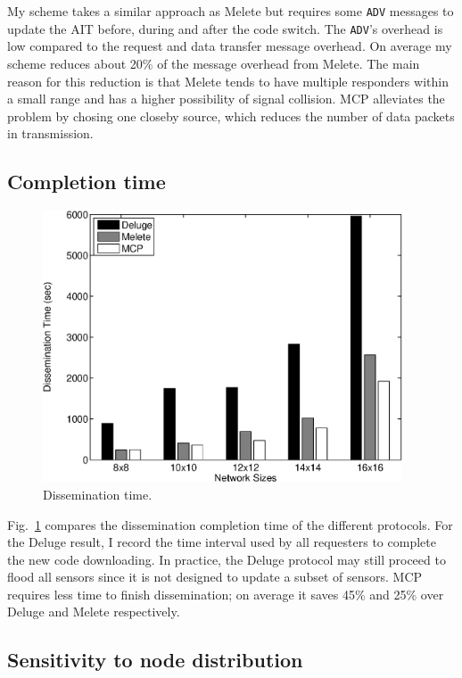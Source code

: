 My scheme takes a similar approach as Melete but requires some {\tt ADV} messages to update the AIT before, during and after the code switch. The {\tt ADV}'s overhead is low compared to the request and data transfer message overhead. On average my scheme reduces about 20\% of the message overhead from Melete. The main reason for this reduction is that Melete tends to have multiple responders within a small range and has a higher possibility of signal collision. MCP alleviates the problem by chosing one closeby source, which reduces the number of data packets in transmission.

\subsection{Completion time}

\begin{figure}[htbp]
\centering
\includegraphics[width=4.2in]{figures/ftime.eps}
\caption{Dissemination time.}
\label{ftime}
\end{figure}

Fig.~\ref{ftime} compares the dissemination completion time of the different protocols. For the Deluge result, I record the time interval used by all requesters to complete the new code downloading. In practice, the Deluge protocol may still proceed to flood all sensors since it is not designed to update a subset of sensors. MCP requires less time to finish dissemination; on average it saves 45\% and 25\% over Deluge and Melete respectively.

\subsection{Sensitivity to node distribution}

